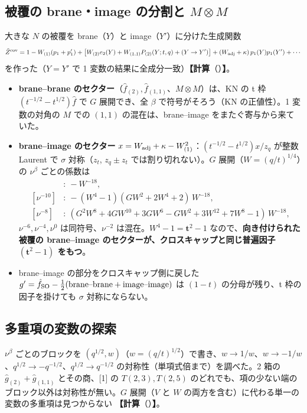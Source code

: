 \documentclass[a4paper,10pt]{ltjsarticle}
\newcommand{\bt}{\bm{t}}
\newcommand{\comp}[1]{\textbf{【計算}\if\relax\detokenize{#1}\relax\else（#1）\fi\textbf{】}}
\begin{document}
\subsection{被覆の brane・image の分割と $M \otimes M$}
大きな $N$ の被覆を brane（$Y$）と image（$Y'$）に分けた生成関数
\[
\tilde Z^{\rm cov} = 1 - W_{(1)}(p_1 + p_1') + \bigl[W_{(2)} e_2(Y) + W_{(1,1)} P_{(2)}(Y;t,q) + (Y \to Y')\bigr] + (W_{\rm adj} + \kappa)\, p_1(Y)p_1(Y') + \cdots
\]
を作った（$Y = Y'$ で 1 変数の結果に全成分一致）\comp{}。
\begin{itemize}
\item \textbf{brane--brane のセクター}（$\hat f_{(2)}, \hat f_{(1,1)}$、$M \otimes M$）は、KN の t 枠 $(t^{-1/2}-t^{1/2})\hat f$ で $G$ 展開でき、全 $\beta$ で符号がそろう（KN の正値性）。1 変数の対角の $M$ での $(1,1)$ の混在は、brane--image をまたぐ寄与から来ていた。
\item \textbf{brane--image のセクター} $x = W_{\rm adj} + \kappa - W_{(1)}^2$：$(t^{-1/2}-t^{1/2})x/z_q$ が整数 Laurent で $\sigma$ 対称（$z_t$, $z_q \pm z_t$ では割り切れない）。$G$ 展開（$W = (q/t)^{1/4}$）の $\nu^\beta$ ごとの係数は
\begin{align*}
[\nu^{-12}]&\colon\ -W^{-18},\\
[\nu^{-10}]&\colon\ -(W^4 - 1)(GW^2 + 2W^4 + 2)\,W^{-18},\\
[\nu^{-8}]&\colon\ (G^2W^8 + 4GW^{10} + 3GW^6 - GW^2 + 3W^{12} + 7W^8 - 1)\,W^{-18},
\end{align*}
$\nu^{-6}, \nu^{-4}, \nu^0$ は同符号、$\nu^{-2}$ は混在。$W^4 - 1 = \bt^2 - 1$ なので、\textbf{向き付けられた被覆の brane--image のセクターが、クロスキャップと同じ普遍因子 $(\bt^2 - 1)$ をもつ}。
\item brane--image の部分をクロスキャップ側に戻した $g' = \hat f_{\rm SO} - \tfrac12(\text{brane--brane} + \text{image--image})$ は $(1-t)$ の分母が残り、t 枠の因子を掛けても $\sigma$ 対称にならない。
\end{itemize}

\subsection{多重項の変数の探索}
$\nu^\beta$ ごとのブロックを $(q^{1/2}, w)$（$w = (q/t)^{1/2}$）で書き、$w \to 1/w$、$w \to -1/w$、$q^{1/2} \to -q^{-1/2}$、$q^{1/2} \to q^{-1/2}$ の対称性（単項式倍まで）を調べた。2 箱の $\hat g_{(2)} + \hat g_{(1,1)}$ とその商、[1] の $T(2,3), T(2,5)$ のどれでも、項の少ない端のブロック以外は対称性が無い。$G$ 展開（$V$ と $W$ の両方を含む）に代わる単一の変数の多重項は見つからない \comp{}。
\end{document}
